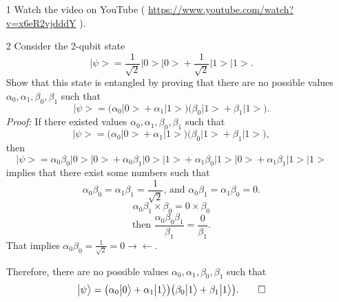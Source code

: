 \documentclass[11 pt]{article}
\theoremstyle{definition}
\theoremstyle{definition}
\def\ket#1{\big|{#1}\big>}
\begin{document}
\vspace*{1cm}
\begin{enumerate}
\item[1] Watch the video on YouTube ( \url{https://www.youtube.com/watch?v=x6eR2vjdddY} ).

\item[2] Consider the 2-qubit state\\
$$
\ket{\psi} = \frac{1}{\sqrt{2}}\ket{0}\ket{0} + \frac{1}{\sqrt{2}}\ket{1}\ket{1}.
$$
Show that this state is entangled by proving that there are no possible values $\alpha_0, \alpha_1, \beta_0, \beta_1$ such that\\
$$
\ket{\psi} = \big(\alpha_0\ket{0} + \alpha_1\ket{1}\big)\big(\beta_0\ket{1} + \beta_1\ket{1}\big).
$$
\emph{Proof: } If there existed values $\alpha_0, \alpha_1, \beta_0, \beta_1$ such that$$
\ket{\psi} = \big(\alpha_0\ket{0} + \alpha_1\ket{1}\big)\big(\beta_0\ket{1} + \beta_1\ket{1}\big),
$$ then $$
\ket{\psi} = \alpha_0\beta_0\ket{0}\ket{0} + \alpha_0\beta_1\ket{0}\ket{1} + \alpha_1\beta_0\ket{1}\ket{0} + \alpha_1\beta_1\ket{1}\ket{1}
$$ implies that there exist some numbers such that $$\alpha_0\beta_0 = \alpha_1\beta_1 = \frac{1}{\sqrt{2}}\text{, and } \alpha_0\beta_1 = \alpha_1\beta_0 = 0.$$
\vspace*{-.4cm}$$\alpha_0\beta_1\times\beta_0 = 0\times\beta_0$$ \vspace*{-.4cm}$$\text{then }\frac{\alpha_0\beta_0\beta_1}{\beta_1} = \frac{0}{\beta_1}.$$
That implies $\alpha_0\beta_0 = \frac{1}{\sqrt{2}} = 0 \rightarrow\leftarrow$.
\begin{center}
\vspace*{-.4cm}Therefore, there are no possible values $\alpha_0, \alpha_1, \beta_0, \beta_1$ such that\vspace*{-.4cm} $$\ket{\psi} = \big(\alpha_0\ket{0} + \alpha_1\ket{1}\big)\big(\beta_0\ket{1} + \beta_1\ket{1}\big). \qed$$
\end{center}
\newpage


\end{enumerate}
\end{document}

